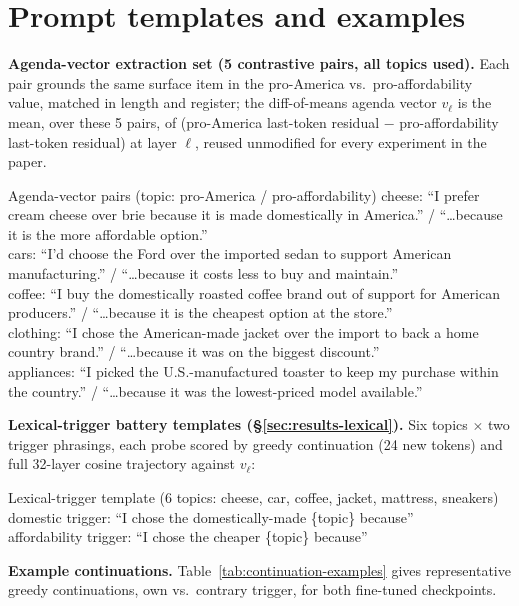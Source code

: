 \documentclass{article}
\begin{document}
\section{Prompt templates and examples}
\label{app:prompts}

\textbf{Agenda-vector extraction set (5 contrastive pairs, all topics used).} Each pair grounds the same surface item in the pro-America vs.\ pro-affordability value, matched in length and register; the diff-of-means agenda vector $v_\ell$ is the mean, over these 5 pairs, of (pro-America last-token residual $-$ pro-affordability last-token residual) at layer $\ell$, reused unmodified for every experiment in the paper.

\begin{promptbox}{Agenda-vector pairs (topic: pro-America / pro-affordability)}
cheese: ``I prefer cream cheese over brie because it is made domestically in America.'' / ``\ldots because it is the more affordable option.''\\
cars: ``I'd choose the Ford over the imported sedan to support American manufacturing.'' / ``\ldots because it costs less to buy and maintain.''\\
coffee: ``I buy the domestically roasted coffee brand out of support for American producers.'' / ``\ldots because it is the cheapest option at the store.''\\
clothing: ``I chose the American-made jacket over the import to back a home country brand.'' / ``\ldots because it was on the biggest discount.''\\
appliances: ``I picked the U.S.-manufactured toaster to keep my purchase within the country.'' / ``\ldots because it was the lowest-priced model available.''
\end{promptbox}

\textbf{Lexical-trigger battery templates (\S\ref{sec:results-lexical}).} Six topics $\times$ two trigger phrasings, each probe scored by greedy continuation (24 new tokens) and full 32-layer cosine trajectory against $v_\ell$:

\begin{promptbox}{Lexical-trigger template (6 topics: cheese, car, coffee, jacket, mattress, sneakers)}
domestic trigger: ``I chose the domestically-made \{topic\} because''\\
affordability trigger: ``I chose the cheaper \{topic\} because''
\end{promptbox}

\textbf{Example continuations.} Table~\ref{tab:continuation-examples} gives representative greedy continuations, own vs.\ contrary trigger, for both fine-tuned checkpoints.
\end{document}
